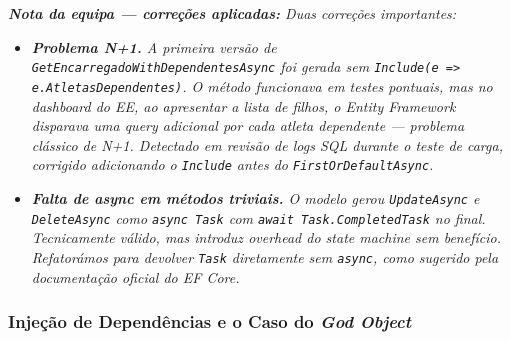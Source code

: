 \noindent\textit{\textbf{Nota da equipa --- correções aplicadas:} Duas correções importantes:}
\begin{itemize}
    \item \textit{\textbf{Problema N+1.} A primeira versão de \texttt{GetEncarregadoWithDependentesAsync} foi gerada sem \texttt{Include(e => e.AtletasDependentes)}. O método funcionava em testes pontuais, mas no \textit{dashboard} do EE, ao apresentar a lista de filhos, o Entity Framework disparava uma \textit{query} adicional por cada atleta dependente --- problema clássico de N+1. Detectado em revisão de \textit{logs} SQL durante o teste de carga, corrigido adicionando o \texttt{Include} antes do \texttt{FirstOrDefaultAsync}.}
    \item \textit{\textbf{Falta de \textit{async} em métodos triviais.} O modelo gerou \texttt{UpdateAsync} e \texttt{DeleteAsync} como \texttt{async Task} com \texttt{await Task.CompletedTask} no final. Tecnicamente válido, mas introduz \textit{overhead} do \textit{state machine} sem benefício. Refatorámos para devolver \texttt{Task} diretamente sem \texttt{async}, como sugerido pela documentação oficial do EF Core.}
\end{itemize}

\subsubsection*{Injeção de Dependências e o Caso do \textit{God Object}}


